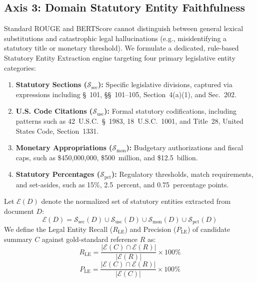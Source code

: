 \documentclass[conference]{IEEEtran}
\begin{document}
\subsection{Axis 3: Domain Statutory Entity Faithfulness}
Standard ROUGE and BERTScore cannot distinguish between general lexical substitutions and catastrophic legal hallucinations (e.g., misidentifying a statutory title or monetary threshold). We formulate a dedicated, rule-based Statutory Entity Extraction engine targeting four primary legislative entity categories:
\begin{enumerate}
    \item \textbf{Statutory Sections ($\mathcal{S}_{\text{sec}}$):} Specific legislative divisions, captured via expressions including \S~101, \S\S~101--105, Section~4(a)(1), and Sec.~202.
    \item \textbf{U.S. Code Citations ($\mathcal{S}_{\text{usc}}$):} Formal statutory codifications, including patterns such as 42~U.S.C.~\S~1983, 18~U.S.C.~1001, and Title~28, United States Code, Section~1331.
    \item \textbf{Monetary Appropriations ($\mathcal{S}_{\text{mon}}$):} Budgetary authorizations and fiscal caps, such as \$450,000,000, \$500~million, and \$12.5~billion.
    \item \textbf{Statutory Percentages ($\mathcal{S}_{\text{pct}}$):} Regulatory thresholds, match requirements, and set-asides, such as 15\%, 2.5~percent, and 0.75~percentage points.
\end{enumerate}

Let $\mathcal{E}(D)$ denote the normalized set of statutory entities extracted from document $D$:
\begin{equation}
\mathcal{E}(D) = \mathcal{S}_{\text{sec}}(D) \cup \mathcal{S}_{\text{usc}}(D) \cup \mathcal{S}_{\text{mon}}(D) \cup \mathcal{S}_{\text{pct}}(D)
\label{eq:entity_union}
\end{equation}
We define the Legal Entity Recall ($R_{\text{LE}}$) and Precision ($P_{\text{LE}}$) of candidate summary $C$ against gold-standard reference $R$ as:
\begin{equation}
R_{\text{LE}} = \frac{|\mathcal{E}(C) \cap \mathcal{E}(R)|}{|\mathcal{E}(R)|} \times 100\%
\label{eq:entity_recall}
\end{equation}
\begin{equation}
P_{\text{LE}} = \frac{|\mathcal{E}(C) \cap \mathcal{E}(R)|}{|\mathcal{E}(C)|} \times 100\%
\label{eq:entity_precision}
\end{equation}
\end{document}
